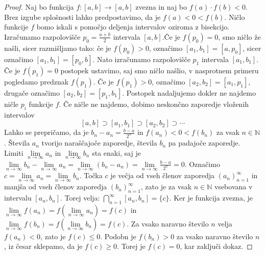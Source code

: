 \documentclass[mat2]{fmfdelo}
\newcommand{\N}{\mathbb N}
\begin{document}
\begin{proof}
Naj bo funkcija $f:[a, b] \to [a, b]$ zvezna in naj bo $f(a)\cdot f(b) < 0$. Brez izgube splošnosti lahko predpostavimo, da je $f(a) < 0 < f(b)$. Ničlo funkcije $f$ bomo iskali s pomočjo deljenja intervalov oziroma z bisekcijo. Izračunamo razpolovišče $p_0=\frac{a+b}{2}$ intervala $[a, b]$.Če je $f(p_0)=0$, smo ničlo že našli, sicer razmišljamo tako: če je $f(p_0) >0$, označimo $[a_1, b_1] =  [a, p_0]$, sicer označimo $[a_1, b_1] =  [p_0, b]$. Nato izračunamo razpolovišče $p_1$ intervala $[a_1, b_1]$. Če je $f(p_1)=0$ postopek ustavimo, saj smo ničlo našlio, v nasprotnem primeru pogledamo predznak $f(p_1)$. Če je $f(p_1) >0$, označimo $[a_2, b_2] =  [a_1, p_1]$, drugače označimo $[a_2, b_2] =  [p_1, b_1]$. Postopek nadaljujemo dokler ne najdemo ničle $p_i$ funkcije $f$. Če ničle ne najdemo, dobimo neskončno zaporedje vloženih intervalov 
$$ [a, b] \supset [a_1, b_1] \supset [a_2, b_2] \supset \cdots$$
Lahko se prepričamo, da je $b_n - a_n = \frac{b-a}{2^n}$ in $f(a_n)<0<f(b_n)$ za vsak $n\in \N$. Števila $a_n$ tvorijo naraščajoče zaporedje, števila $b_n$ pa padajoče zaporedje.  Limiti $\lim\limits_{n \to \infty} a_n$ in $\lim\limits_{n \to \infty} b_n$ sta enaki, saj je 
$\lim\limits_{n \to \infty} b_n - \lim\limits_{n \to \infty} a_n = \lim\limits_{n \to \infty} (b_n - a_n) = \lim\limits_{n \to \infty} \frac{b - a}{2^n} = 0$. Označimo $c = \lim\limits_{n \to \infty} a_n = \lim\limits_{n \to \infty} b_n$. Točka $c$ je večja od vseh členov zaporedja $\left(a_n \right)_{n=1}^{\infty}$ in manjša od vseh členov zaporedja $\left(b_n \right)_{n=1}^{\infty}$, zato je za vsak $n \in \N$ vsebovana v intervalu $[a_n, b_n]$. Torej velja:
$\bigcap\limits_{n=1}^{\infty} [a_n, b_n] = \{c\}$. 
Ker je funkcija zvezna, je 
$\lim\limits_{n \to \infty} f(a_n) = f\left(\lim\limits_{n \to \infty} a_n\right) = f(c)$
in 
$\lim\limits_{n \to \infty} f(b_n) = f\left(\lim\limits_{n \to \infty} b_n\right) = f(c)$.
Za vsako naravno število $n$ velja $f(a_n) <0$, zato je $f(c) \leq 0$. Podobn je $f(b_n) > 0$ za vsako naravno število $n$, iz česar sklepamo, da je $f(c) \geq 0$. Torej je $f(c) = 0$, kar zaključi dokaz.
\end{proof}
\end{document}
